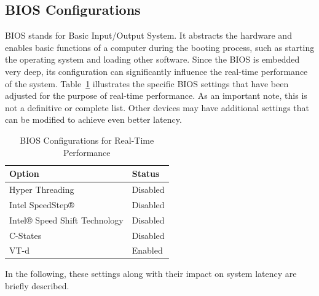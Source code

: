 \documentclass[MMR,Master,english]{style/twbook}
\begin{document}
\clearpage

\subsection{BIOS Configurations}\label{subsec:bios_configurations}

BIOS stands for Basic Input/Output System. It abstracts the hardware and enables basic functions of a computer during the booting process, such as starting the operating system and loading other software. Since the BIOS is embedded very deep, its configuration can significantly influence the real-time performance of the system. Table~\ref{tab:bios_configuration} illustrates the specific BIOS settings that have been adjusted for the purpose of real-time performance. As an important note, this is not a definitive or complete list. Other devices may have additional settings that can be modified to achieve even better latency.

\begin{table}[H]
	\centering
	\caption{BIOS Configurations for Real-Time Performance}
	\label{tab:bios_configuration}
	\setlength{\tabcolsep}{0.5em} %
	{\renewcommand{\arraystretch}{1.2}%
		\begin{tabular}{|l|l|}
			\hline
			\textbf{Option}               & \textbf{Status} \\
			\hline
			Hyper Threading               & Disabled        \\
			\hline
			Intel SpeedStep®              & Disabled        \\
			\hline
			Intel® Speed Shift Technology & Disabled        \\
			\hline
			C-States                      & Disabled        \\
			\hline
			VT-d                          & Enabled         \\
			\hline
		\end{tabular}}
\end{table}

\noindent In the following, these settings along with their impact on system latency are briefly described.
\end{document}
